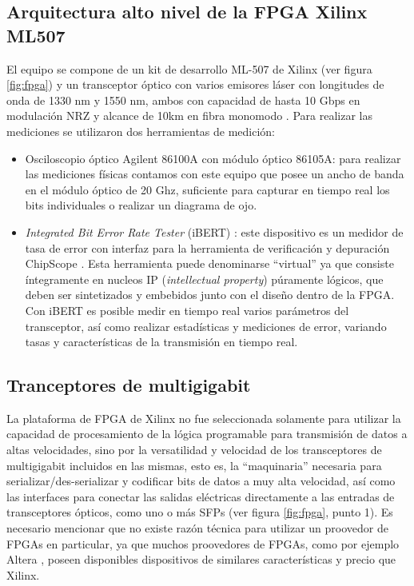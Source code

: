 \subsection{Arquitectura alto nivel de la FPGA Xilinx ML507}
El equipo se compone de un kit de desarrollo ML-507 de Xilinx \cite{virtex5fpga} (ver figura \ref{fig:fpga}) y un transceptor óptico con varios emisores láser con longitudes de onda de 1330 nm y 1550 nm, ambos con capacidad de hasta 10 Gbps en modulación NRZ y alcance de 10km en fibra monomodo \cite{virtex5fpgaRIO}. Para realizar las mediciones se utilizaron dos herramientas de medición:
\begin{itemize}
 \item Osciloscopio óptico Agilent 86100A con módulo óptico 86105A: para
realizar las mediciones físicas contamos con este equipo que posee un
ancho de banda en el módulo óptico de 20 Ghz, suficiente para capturar en
tiempo real los bits individuales o realizar un diagrama de ojo.
\item {\em Integrated Bit Error Rate Tester} (iBERT) \cite{4gtxs}: este dispositivo es un medidor de tasa de error con interfaz para la herramienta de
verificación y depuración ChipScope \cite{arshak2006testing}. Esta herramienta puede denominarse ``virtual'' ya que consiste íntegramente en nucleos IP (\textit{intellectual property}) púramente lógicos, que deben ser sintetizados y embebidos junto con el diseño dentro de la FPGA.
Con iBERT es posible medir en tiempo real varios parámetros del transceptor, así como realizar estadísticas y mediciones de error, variando tasas y características de la transmisión en tiempo real.
 
\end{itemize}
\subsection{Tranceptores de multigigabit}
La plataforma de FPGA de Xilinx no fue seleccionada solamente para utilizar la capacidad de procesamiento de la lógica programable para transmisión de datos a altas velocidades, sino por la versatilidad y velocidad de los transceptores de multigigabit incluidos en las mismas, esto es, la ``maquinaria'' necesaria para serializar/des-serializar y codificar bits de datos a muy alta velocidad, así como las interfaces para conectar las salidas eléctricas directamente a las entradas de transceptores ópticos, como uno o más SFPs \cite{ug198} (ver figura \ref{fig:fpga}, punto 1). Es necesario mencionar que no existe razón técnica para utilizar un proovedor de FPGAs en particular, ya que muchos proovedores de FPGAs, como por ejemplo Altera \cite{Altera}, poseen disponibles dispositivos de similares características y precio que Xilinx.

